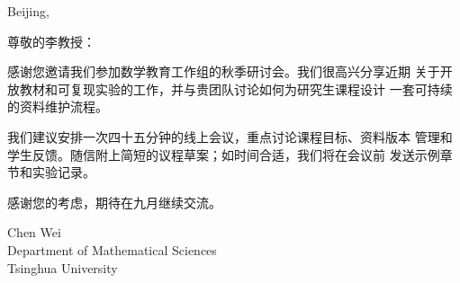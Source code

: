 \documentclass[12pt]{article}
\begin{document}
\begin{flushright}
  Beijing, \zhtoday
\end{flushright}

\vspace{1.2cm}
{\Large\noindent 尊敬的李教授：}

\vspace{1em}
\large
\setlength{\parindent}{2em}

感谢您邀请我们参加数学教育工作组的秋季研讨会。我们很高兴分享近期
关于开放教材和可复现实验的工作，并与贵团队讨论如何为研究生课程设计
一套可持续的资料维护流程。

我们建议安排一次四十五分钟的线上会议，重点讨论课程目标、资料版本
管理和学生反馈。随信附上简短的议程草案；如时间合适，我们将在会议前
发送示例章节和实验记录。

感谢您的考虑，期待在九月继续交流。

\vspace{2em}
\begin{flushright}
  Chen Wei\\
  Department of Mathematical Sciences\\
  Tsinghua University
\end{flushright}
\end{document}

